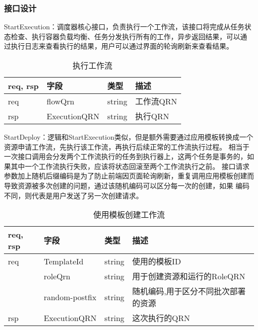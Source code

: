 \subsubsection{接口设计}

StartExecution：调度器核心接口，负责执行一个工作流，该接口将完成从任务状态检查、执行容器负载均衡、任务分发执行所有的工作，异步返回结果，可以通
过执行日志来查看执行的结果，用户可以通过界面的轮询刷新来查看结果。
\begin{table}[H]
    \centering
    \caption{执行工作流}
    \label{tab:design-interface-start-execution}
    \begin{tabular}{llll}
        \toprule
        req, rsp   & 字段 & 类型 & 描述 \\
        \midrule
        req & flowQrn & string & 工作流QRN\\
        rsp & ExecutionQRN & string & 执行QRN\\
        \bottomrule
    \end{tabular}
\end{table}

StartDeploy：逻辑和StartExecution类似，但是额外需要通过应用模板转换成一个资源申请工作流，先执行该工作流，再执行后续正常的工作流执行过程。
相当于一次接口调用会分发两个工作流执行的任务到执行器上，这两个任务是事务的，如果其中一个工作流执行失败，应该将状态回滚至两个工作流执行之前。
接口请求参数加上随机后缀编码是为了防止前端因页面轮询刷新，重复调用应用模板创建而导致资源被多次创建的问题，通过该随机编码可以区分每一次的创建，如果
编码不同，则代表是用户发送了另一次创建请求。
    \begin{table}[H]
        \centering
        \caption{使用模板创建工作流}
        \label{tab:design-interface-start-deploy}
        \begin{tabular}{llll}
            \toprule
            req, rsp   & 字段 & 类型 & 描述 \\
            \midrule
            req & TemplateId & string & 使用的模板ID\\
            & roleQrn & string & 用于创建资源和运行的RoleQRN\\
            & random-postfix & string & 随机编码,用于区分不同批次部署的资源\\ \hline
            rsp & ExecutionQRN & string & 这次执行的QRN\\
            \bottomrule
        \end{tabular}
    \end{table}

